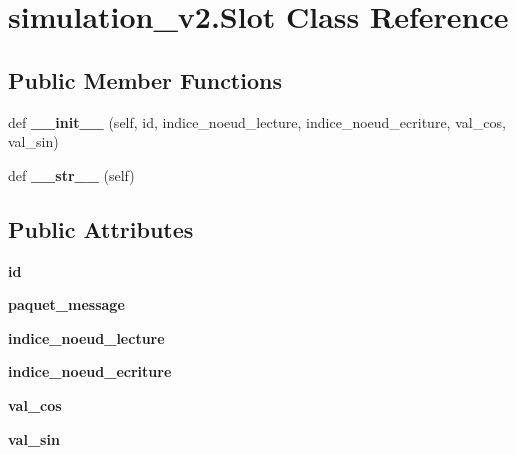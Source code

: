 \hypertarget{classsimulation__v2_1_1Slot}{}\section{simulation\+\_\+v2.\+Slot Class Reference}
\label{classsimulation__v2_1_1Slot}
\subsection*{Public Member Functions}
\begin{DoxyCompactItemize}
\item 
def {\bfseries \+\_\+\+\_\+init\+\_\+\+\_\+} (self, id, indice\+\_\+noeud\+\_\+lecture, indice\+\_\+noeud\+\_\+ecriture, val\+\_\+cos, val\+\_\+sin)\hypertarget{classsimulation__v2_1_1Slot_acc962de07087e4783ed23fd048cf5a97}{}\label{classsimulation__v2_1_1Slot_acc962de07087e4783ed23fd048cf5a97}

\item 
def {\bfseries \+\_\+\+\_\+str\+\_\+\+\_\+} (self)\hypertarget{classsimulation__v2_1_1Slot_a9efb27289d81250c819805f660d68ff4}{}\label{classsimulation__v2_1_1Slot_a9efb27289d81250c819805f660d68ff4}

\end{DoxyCompactItemize}
\subsection*{Public Attributes}
\begin{DoxyCompactItemize}
\item 
{\bfseries id}\hypertarget{classsimulation__v2_1_1Slot_a96310cfd1daa82093c81cb384313d49f}{}\label{classsimulation__v2_1_1Slot_a96310cfd1daa82093c81cb384313d49f}

\item 
{\bfseries paquet\+\_\+message}\hypertarget{classsimulation__v2_1_1Slot_a67f1a9377957b989a03d35c0dfe26e0b}{}\label{classsimulation__v2_1_1Slot_a67f1a9377957b989a03d35c0dfe26e0b}

\item 
{\bfseries indice\+\_\+noeud\+\_\+lecture}\hypertarget{classsimulation__v2_1_1Slot_aeaa12071d9fac7c64973a33a207c0f3b}{}\label{classsimulation__v2_1_1Slot_aeaa12071d9fac7c64973a33a207c0f3b}

\item 
{\bfseries indice\+\_\+noeud\+\_\+ecriture}\hypertarget{classsimulation__v2_1_1Slot_ab8bb24759b6a0e0a53701558d91441bc}{}\label{classsimulation__v2_1_1Slot_ab8bb24759b6a0e0a53701558d91441bc}

\item 
{\bfseries val\+\_\+cos}\hypertarget{classsimulation__v2_1_1Slot_a40b5335837b3a3f44ef1253a0fc4a7d6}{}\label{classsimulation__v2_1_1Slot_a40b5335837b3a3f44ef1253a0fc4a7d6}

\item 
{\bfseries val\+\_\+sin}\hypertarget{classsimulation__v2_1_1Slot_a585436b336005434401062035e4a609e}{}\label{classsimulation__v2_1_1Slot_a585436b336005434401062035e4a609e}

\end{DoxyCompactItemize}


